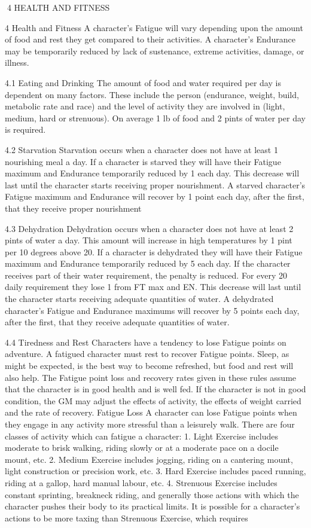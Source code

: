 \documentclass[a4paper]{article}
\begin{document}
\begin{multicols}{3}
4 HEALTH AND FITNESS

4 Health and Fitness
A character’s Fatigue will vary depending upon the
amount of food and rest they get compared to their
activities.
A character’s Endurance may be temporarily reduced by lack of sustenance, extreme activities,
damage, or illness.

4.1 Eating and Drinking
The amount of food and water required per day is
dependent on many factors. These include the
person (endurance, weight, build, metabolic rate
and race) and the level of activity they are involved
in (light, medium, hard or strenuous).
On average 1 lb of food and 2 pints of water per
day is required.

4.2 Starvation
Starvation occurs when a character does not have
at least 1 nourishing meal a day.
If a character is starved they will have their Fatigue
maximum and Endurance temporarily reduced by 1
each day. This decrease will last until the character
starts receiving proper nourishment.
A starved character’s Fatigue maximum and Endurance will recover by 1 point each day, after the
first, that they receive proper nourishment

4.3 Dehydration
Dehydration occurs when a character does not have
at least 2 pints of water a day. This amount will
increase in high temperatures by 1 pint per 10
degrees above 20.
If a character is dehydrated they will have their
Fatigue maximum and Endurance temporarily
reduced by 5 each day. If the character receives
part of their water requirement, the penalty is reduced. For every 20%
daily requirement they lose 1 from FT max and
EN. This decrease will last until the character starts
receiving adequate quantities of water.
A dehydrated character’s Fatigue and Endurance
maximums will recover by 5 points each day, after
the first, that they receive adequate quantities of
water.

4.4 Tiredness and Rest
Characters have a tendency to lose Fatigue points
on adventure. A fatigued character must rest to
recover Fatigue points. Sleep, as might be expected, is the best way to become refreshed, but
food and rest will also help.
The Fatigue point loss and recovery rates given in
these rules assume that the character is in good
health and is well fed. If the character is not in
good condition, the GM may adjust the effects of
activity, the effects of weight carried and the rate
of recovery.
Fatigue Loss
A character can lose Fatigue points when they
engage in any activity more stressful than a leisurely walk.
There are four classes of activity which can fatigue
a character:
1. Light Exercise includes moderate to brisk walking, riding slowly or at a moderate pace on a docile
mount, etc.
2. Medium Exercise includes jogging, riding on a
cantering mount, light construction or precision
work, etc.
3. Hard Exercise includes paced running, riding at
a gallop, hard manual labour, etc.
4. Strenuous Exercise includes constant sprinting,
breakneck riding, and generally those actions with
which the character pushes their body to its practical limits.
It is possible for a character’s actions to be more
taxing than Strenuous Exercise, which requires


\end{multicols}
\end{document}
